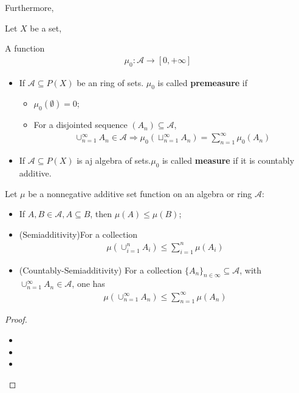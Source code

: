 \documentclass[Total.tex]{subfiles}
\begin{document}
			Furthermore,
			\begin{Def}Let $X$ be a set,
				
				A function
				\begin{gather*}
					\mu_0:\mathcal{A}\rightarrow [0,+\infty]
				\end{gather*}
				\begin{itemize}
					\item If  $\mathcal{A}\subseteq P(X)$ be an ring of sets. $\mu_0$ is called \textbf{premeasure} if
					\begin{itemize}
						\item $\mu_0(\emptyset)=0$;
						\item For a disjointed sequence $(A_n)\subseteq \mathcal{A}$,
						\begin{gather*}
							\cup_{n=1}^\infty A_n\in \mathcal{A}\Rightarrow \mu_0(\sqcup_{n=1}^\infty
							A_n)=\sum_{n=1}^\infty \mu_0(A_n)
						\end{gather*}
					\end{itemize}
					
					\item If  $\mathcal{A}\subseteq P(X)$ is aj algebra of sets.$\mu_0$ is called \textbf{measure} if it is countably additive. 
				\end{itemize}
			\end{Def}
			
			\begin{proposition}
				Let $\mu$ be a nonnegative additive set function on an algebra or ring $\mathcal{A}$:
				\begin{itemize}
					\item If $A,B\in \mathcal{A},A\subseteq B$, then $\mu(A)\leq \mu(B)$;
					\item (Semiadditivity)For a collection 
					\begin{gather*}
						\mu(\cup_{i=1}^n A_i)\leq \sum_{i=1}^n \mu(A_i)
					\end{gather*}
					
					\item (Countably-Semiadditivity) For a collection $\{A_n\}_{n\in\infty}\subseteq\mathcal{A}$, with $\cup_{n=1}^\infty A_n\in \mathcal{A}$, one has
					\begin{gather*}
						\mu(\cup_{n=1}^\infty A_n)\leq \sum_{n=1}^\infty \mu(A_n)
					\end{gather*}
				\end{itemize}
			\end{proposition}
			\begin{proof}
				\begin{itemize}
					\item 
					\item 
					\item 
				\end{itemize}
			\end{proof}
		
\end{document}
